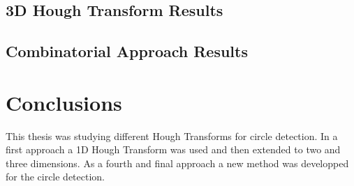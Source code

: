 \documentclass[11pt,twoside]{scrreprt}
\begin{document}

\section{3D Hough Transform Results} %
\label{sec:3d_hough_transform_results}


\section{Combinatorial Approach Results} %
\label{sec:combinatorial_approach_results}


\chapter{Conclusions} %
\label{cha:conclusions}

This thesis was studying different Hough Transforms for circle detection. In a first approach a 1D Hough Transform was used and then extended to two and three
dimensions.
As a fourth and final approach a new method was developped for the circle detection. 


\printbibliography
\end{document}
